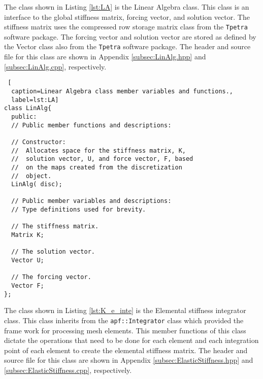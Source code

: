 \documentclass[a4paper, 12pt]{article}
\begin{document}
The class shown in Listing 
\ref{lst:LA} is the 
Linear Algebra 
class.  
This class is an interface to the global stiffness matrix, forcing
vector, and solution vector. The stiffness matrix uses the 
compressed row storage matrix class from the \texttt{Tpetra}
software package. The forcing vector and solution vector are 
stored as defined by the Vector class also from the \texttt{Tpetra}
software package.
The header and source file for this class are shown in Appendix 
\ref{subsec:LinAlg.hpp} and 
\ref{subsec:LinAlg.cpp}, 
respectively.

\begin{lstlisting} [
  caption=Linear Algebra class member variables and functions.,
  label=lst:LA]
class LinAlg{
  public:
  // Public member functions and descriptions:

  // Constructor:
  //  Allocates space for the stiffness matrix, K, 
  //  solution vector, U, and force vector, F, based
  //  on the maps created from the discretization 
  //  object.
  LinAlg( disc);

  // Public member variables and descriptions:
  // Type definitions used for brevity.

  // The stiffness matrix.
  Matrix K;
  
  // The solution vector.
  Vector U;

  // The forcing vector.
  Vector F;
};
\end{lstlisting}
\vspace{\baselineskip}

The class shown in Listing 
\ref{lst:K_e_inte} is the 
Elemental stiffness integrator
class.
This class inherits from the \texttt{apf::Integrator} class
which provided the frame work for processing mesh elements.
This member functions of this class dictate the operations that 
need to be done for each element and each integration point 
of each element to create the elemental stiffness matrix.
The header and source file for this class are shown in Appendix 
\ref{subsec:ElasticStiffness.hpp} and 
\ref{subsec:ElasticStiffness.cpp}, 
respectively.
\end{document}
